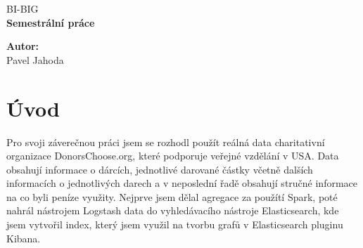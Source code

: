 \documentclass[12pt,a4paper]{article}
\begin{document}


\renewcommand{\headrulewidth}{0pt}
\renewcommand{\footrulewidth}{0pt}

\begin{titlepage}
  \thispagestyle{fancy}

  \vspace*{\fill}
  \begin{center}
    {\fontsize{20}{30}\selectfont BI-BIG}\\[1cm]
    {\fontsize{30}{100}\selectfont \textbf{Semestrální práce}}\\[4.2cm]
  \end{center}

  \vspace*{\fill}

  {\fontsize{10}{10} \selectfont \noindent
  \textbf{Autor:}\\
  Pavel Jahoda
  }
\end{titlepage}

\newpage

\renewcommand{\headrulewidth}{0.4pt}
\renewcommand{\footrulewidth}{0.4pt}




\tableofcontents

\newpage



\section{Úvod}
Pro svoji záverečnou práci jsem se rozhodl použít reálná data charitativní organizace DonorsChoose.org, které podporuje veřejné vzdělání v USA. Data obsahují informace o dárcích, jednotlivé darované částky včetně dalších informacích o jednotlivých darech a v neposlední řadě obsahují stručné informace na co byli peníze využity. Nejprve jsem dělal agregace za použítí Spark, poté nahrál nástrojem Logstash data do vyhledávacího nástroje Elasticsearch, kde jsem vytvořil index, který jsem využil na tvorbu grafů v Elasticsearch pluginu Kibana.
\end{document}
